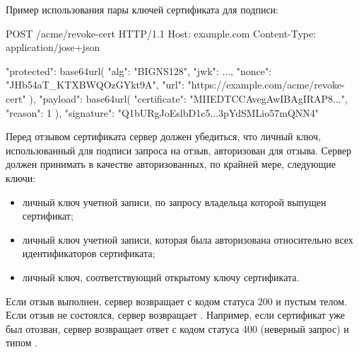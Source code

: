 Пример использования пары ключей сертификата для подписи:

\begin{codeblock}
POST /acme/revoke-cert HTTP/1.1
Host: example.com
Content-Type: application/jose+json

{
  "protected": base64url({
    "alg": "BIGNS128",
    "jwk": {...},
    "nonce": "JHb54aT_KTXBWQOzGYkt9A",
    "url": "https://example.com/acme/revoke-cert"
  }),
  "payload": base64url({
    "certificate": "MIIEDTCCAvegAwIBAgIRAP8...",
    "reason": 1
  }),
  "signature": "Q1bURgJoEslbD1c5...3pYdSMLio57mQNN4"
} 
\end{codeblock}
\fi

Перед отзывом сертификата сервер должен убедиться, что личный ключ,
использованный для подписи запроса на отзыв, авторизован для отзыва. Сервер
должен принимать в качестве авторизованных, по крайней мере, следующие ключи:

\begin{itemize}
\item 
личный ключ учетной записи, по запросу владельца которой выпущен сертификат;
\item
личный ключ учетной записи, которая была авторизована относительно всех 
идентификаторов сертификата;
\item
личный ключ, соответствующий открытому ключу сертификата.
\end{itemize}

Если отзыв выполнен, сервер возвращает  с 
кодом статуса 200 и пустым телом. Если отзыв не состоялся, сервер возвращает 
. Например, если сертификат уже был 
отозван, сервер возвращает ответ с кодом статуса 400 (неверный запрос) и типом 
.

\fi
